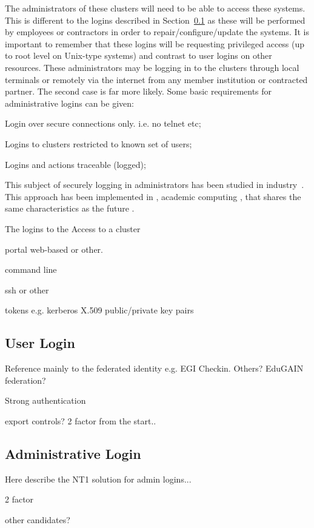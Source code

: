 \documentclass[12pt,a4paper]{article}
\begin{document}
The administrators of these clusters will need to be able to access these systems.
This is different to the logins described in Section~\ref{sec:users} as these will be performed by \EC employees or contractors
in order to repair/configure/update the systems.
It is important to remember that these logins will be requesting privileged access (up to root level on Unix-type systems) and contrast to user logins on other \einfra resources.
These administrators may be logging in to the clusters through local terminals or remotely via the internet from any \EC member institution
or contracted partner.
The second case is far more likely.
Some basic requirements for administrative logins can be given:
\bitm
\item Login over secure connections only. i.e. no telnet etc;
\item Logins to clusters restricted to known set of users;
\item Logins and actions traceable (logged);
\eitm

This subject of securely logging in administrators has been studied in industry~\cite{fb-ssh}.
This approach has been implemented in \nnt, academic computing \einfra, that shares the same characteristics as the future \ED \einfra.


The logins to the \ED 
Access to a cluster

portal web-based or other.

command line 

ssh or other

tokens e.g. kerberos X.509 public/private key pairs


\subsection{User Login}
\label{sec:users}

Reference mainly to the federated identity e.g. EGI Checkin. Others? EduGAIN federation?

Strong authentication

export controls? 2 factor from the start..


\subsection{Administrative Login}

Here describe the NT1 solution for admin logins...

2 factor

other candidates?


\newpage
{}

\end{document}
